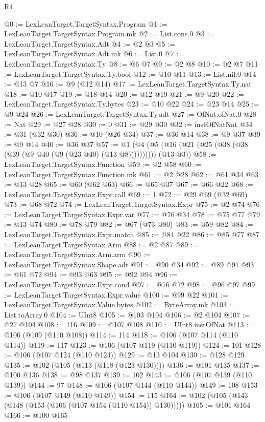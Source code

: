 \begin{lexlean}{R4}
\begin{coremodule}
@0 := LexLeanTarget.TargetSyntax.Program
@1 := LexLeanTarget.TargetSyntax.Program.mk
@2 := List.cons.{0}
@3 := LexLeanTarget.TargetSyntax.Adt
@4 := @2 @3
@5 := LexLeanTarget.TargetSyntax.Adt.mk
@6 := List.{0}
@7 := LexLeanTarget.TargetSyntax.Ty
@8 := @6 @7
@9 := @2 @8
@10 := @2 @7
@11 := LexLeanTarget.TargetSyntax.Ty.bool
@12 := @10 @11
@13 := List.nil.{0}
@14 := @13 @7
@16 := @9 (@12 @14)
@17 := LexLeanTarget.TargetSyntax.Ty.nat
@18 := @10 @17
@19 := @18 @14
@20 := @12 @19
@21 := @9 @20
@22 := LexLeanTarget.TargetSyntax.Ty.bytes
@23 := @10 @22
@24 := @23 @14
@25 := @9 @24
@26 := LexLeanTarget.TargetSyntax.Ty.adt
@27 := OfNat.ofNat.{0}
@28 := Nat
@29 := @27 @28
@30 := 0
@31 := @29 @30
@32 := instOfNatNat
@34 := @31 (@32 @30)
@36 := @10 (@26 @34)
@37 := @36 @14
@38 := @9 @37
@39 := @9 @14
@40 := @36 @37
@57 := @1 (@4 (@5 (@16 (@21 (@25 (@38 (@38 (@39 (@9 @40 (@9 (@23 @40) (@13 @8)))))))))) (@13 @3))
@58 := LexLeanTarget.TargetSyntax.Function
@59 := @2 @58
@60 := LexLeanTarget.TargetSyntax.Function.mk
@61 := @2 @28
@62 := @61 @34
@63 := @13 @28
@65 := @60 (@62 @63)
@66 := @65 @37
@67 := @66 @22
@68 := LexLeanTarget.TargetSyntax.Expr.call
@69 := 1
@72 := @29 @69 (@32 @69)
@73 := @68 @72
@74 := LexLeanTarget.TargetSyntax.Expr
@75 := @2 @74
@76 := LexLeanTarget.TargetSyntax.Expr.var
@77 := @76 @34
@78 := @75 @77
@79 := @13 @74
@80 := @78 @79
@82 := @67 (@73 @80)
@83 := @59 @82
@84 := LexLeanTarget.TargetSyntax.Expr.match
@85 := @84 @22
@86 := @85 @77
@87 := LexLeanTarget.TargetSyntax.Arm
@88 := @2 @87
@89 := LexLeanTarget.TargetSyntax.Arm.arm
@90 := LexLeanTarget.TargetSyntax.Shape.adt
@91 := @90 @34
@92 := @89 @91
@93 := @61 @72
@94 := @93 @63
@95 := @92 @94
@96 := LexLeanTarget.TargetSyntax.Expr.cond
@97 := @76 @72
@98 := @96 @97
@99 := LexLeanTarget.TargetSyntax.Expr.value
@100 := @99 @22
@101 := LexLeanTarget.TargetSyntax.Value.bytes
@102 := ByteArray.mk
@103 := List.toArray.{0}
@104 := UInt8
@105 := @103 @104
@106 := @2 @104
@107 := @27 @104
@108 := 116
@109 := @107 @108
@110 := UInt8.instOfNat
@113 := @106 (@109 (@110 @108))
@114 := 114
@118 := @106 (@107 @114 (@110 @114))
@119 := 117
@123 := @106 (@107 @119 (@110 @119))
@124 := 101
@128 := @106 (@107 @124 (@110 @124))
@129 := @13 @104
@130 := @128 @129
@135 := @102 (@105 (@113 (@118 (@123 @130))))
@136 := @101 @135
@137 := @100 @136
@138 := @98 @137
@139 := 102
@143 := @106 (@107 @139 (@110 @139))
@144 := 97
@148 := @106 (@107 @144 (@110 @144))
@149 := 108
@153 := @106 (@107 @149 (@110 @149))
@154 := 115
@164 := @102 (@105 (@143 (@148 (@153 (@106 (@107 @154 (@110 @154)) @130)))))
@165 := @101 @164
@166 := @100 @165

\end{coremodule}
\end{lexlean}
